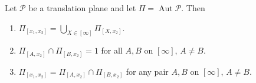 Let $\mathcal{P}$ be a translation plane and let $\Pi = \operatorname{Aut} \mathcal{P}$. Then
\begin{enumerate}
\item[(i)] $\Pi_{[x_1, x_2]} = \bigcup_{X \in [\infty]} \Pi_{[X, x_2]}$.
\item[(ii)] $\Pi_{[A, x_2]} \cap \Pi_{[B, x_2]} = 1$ for all $A, B$ on $[\infty]$, $A \neq B$.
\item[(iii)] $\Pi_{[x_1, x_2]} = \Pi_{[A, x_2]} \cap \Pi_{[B, x_2]}$ for any pair $A, B$ on $[\infty]$, $A \neq B$.
\end{enumerate}
